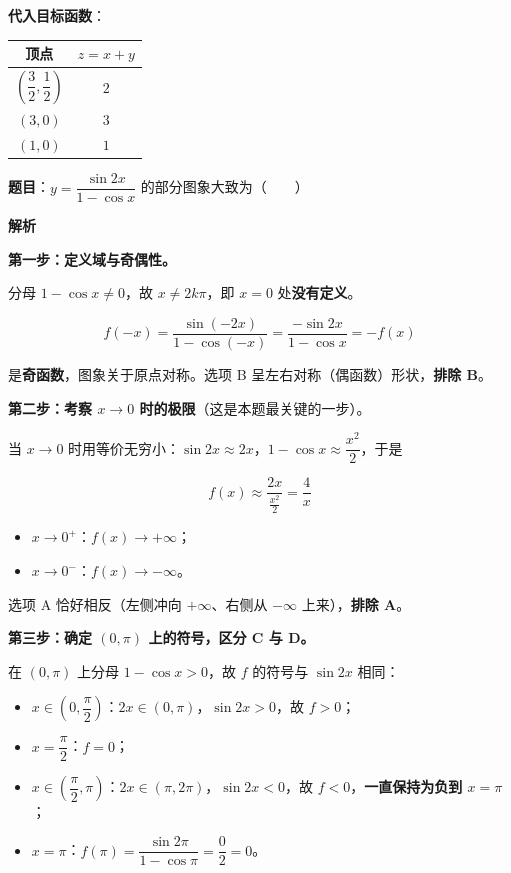 \textbf{代入目标函数}：

\begin{center}
\begin{tabular}{cc}
\toprule
顶点 & $z=x+y$ \\
\midrule
$\left(\dfrac32,\dfrac12\right)$ & $2$ \\
$(3,0)$ & $\boxed{3}$ \\
$(1,0)$ & $1$ \\
\bottomrule
\end{tabular}
\end{center}


\par\medskip


\textbf{题目}：$y=\dfrac{\sin2x}{1-\cos x}$ 的部分图象大致为（　　）

\begin{center}\end{center}

\textbf{解析}

\textbf{第一步：定义域与奇偶性。}

分母 $1-\cos x\ne0$，故 $x\ne2k\pi$，即 $x=0$ 处\textbf{没有定义}。

\[f(-x)=\frac{\sin(-2x)}{1-\cos(-x)}=\frac{-\sin2x}{1-\cos x}=-f(x)\]

是\textbf{奇函数}，图象关于原点对称。选项 B 呈左右对称（偶函数）形状，\textbf{排除 B}。

\textbf{第二步：考察 $x\to0$ 时的极限}（这是本题最关键的一步）。

当 $x\to0$ 时用等价无穷小：$\sin2x\approx2x$，$1-\cos x\approx\dfrac{x^{2}}2$，于是

\[f(x)\approx\frac{2x}{\frac{x^{2}}2}=\frac4x\]

\begin{itemize}
\item $x\to0^{+}$：$f(x)\to+\infty$；
\item $x\to0^{-}$：$f(x)\to-\infty$。
\end{itemize}

选项 A 恰好相反（左侧冲向 $+\infty$、右侧从 $-\infty$ 上来），\textbf{排除 A}。

\textbf{第三步：确定 $(0,\pi)$ 上的符号，区分 C 与 D。}

在 $(0,\pi)$ 上分母 $1-\cos x>0$，故 $f$ 的符号与 $\sin2x$ 相同：

\begin{itemize}
\item $x\in\left(0,\dfrac\pi2\right)$：$2x\in(0,\pi)$，$\sin2x>0$，故 $f>0$；
\item $x=\dfrac\pi2$：$f=0$；
\item $x\in\left(\dfrac\pi2,\pi\right)$：$2x\in(\pi,2\pi)$，$\sin2x<0$，故 $f<0$，\textbf{一直保持为负到 $x=\pi$}；
\item $x=\pi$：$f(\pi)=\dfrac{\sin2\pi}{1-\cos\pi}=\dfrac02=0$。
\end{itemize}

